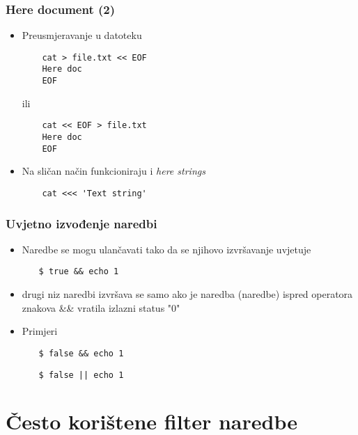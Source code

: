 \documentclass{beamer}
\newcommand{\shell}[1]{\texttt{#1}}
\begin{document}
\begin{frame}[fragile]
\frametitle{Here document (2)}
\begin{itemize}
	\item Preusmjeravanje u datoteku
	\item[] \begin{verbatim}
	cat > file.txt << EOF
	Here doc
	EOF
	\end{verbatim}
	\item[ili] \begin{verbatim}
	cat << EOF > file.txt
	Here doc
	EOF
	\end{verbatim}
\end{itemize}
\begin{itemize}
	\item Na sličan način funkcioniraju i \textit{here strings}
	\item[] \begin{verbatim}
	cat <<< 'Text string'
	\end{verbatim}
\end{itemize}
\end{frame}

\begin{frame}[t]
\frametitle{Uvjetno izvođenje naredbi}
\begin{itemize}
  \item Naredbe se mogu ulančavati tako da se njihovo izvršavanje uvjetuje
  \begin{itemize}
    \item[] \shell{\$ true \&\& echo 1}
  \end{itemize}
  \item drugi niz naredbi izvršava se samo ako je naredba (naredbe) ispred
        operatora znakova \&\& vratila izlazni status "0"
  \item Primjeri
  \begin{itemize}
    \item[] \shell{\$ false \&\& echo 1}
    \item[] \shell{\$ false || echo 1}
  \end{itemize}
\end{itemize}
\end{frame}

\section{Često korištene filter naredbe}
\end{document}
